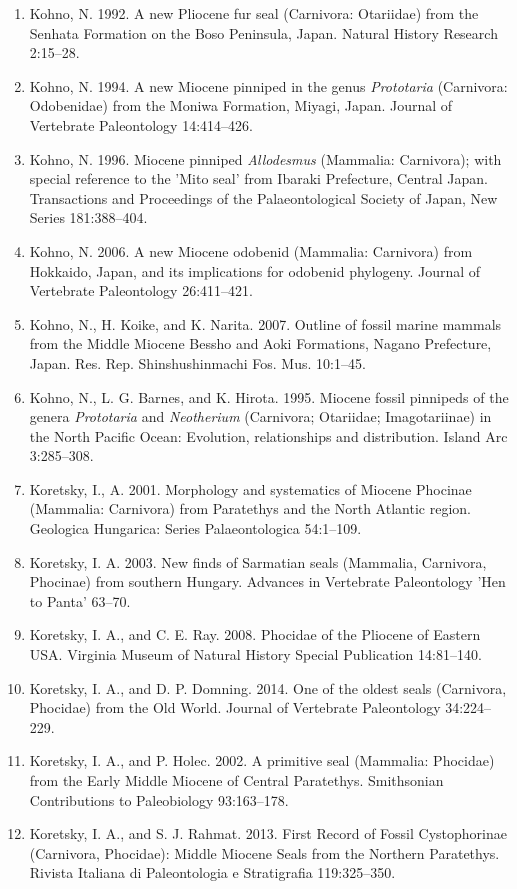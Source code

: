 \documentclass[a4paper, 12pt]{article}
\begin{document}
\begin{enumerate}
\item Kohno, N. 1992. A new Pliocene fur seal (Carnivora: Otariidae) from the Senhata Formation on the Boso Peninsula, Japan. Natural History Research 2:15–28.
\item Kohno, N. 1994. A new Miocene pinniped in the genus \textit{Prototaria} (Carnivora: Odobenidae) from the Moniwa Formation, Miyagi, Japan. Journal of Vertebrate Paleontology 14:414–426.
\item Kohno, N. 1996. Miocene pinniped \textit{Allodesmus} (Mammalia: Carnivora); with special reference to the 'Mito seal' from Ibaraki Prefecture, Central Japan. Transactions and Proceedings of the Palaeontological Society of Japan, New Series 181:388–404.
\item Kohno, N. 2006. A new Miocene odobenid (Mammalia: Carnivora) from Hokkaido, Japan, and its implications for odobenid phylogeny. Journal of Vertebrate Paleontology 26:411–421.
\item Kohno, N., H. Koike, and K. Narita. 2007. Outline of fossil marine mammals from the Middle Miocene Bessho and Aoki Formations, Nagano Prefecture, Japan. Res. Rep. Shinshushinmachi Fos. Mus. 10:1–45.
\item Kohno, N., L. G. Barnes, and K. Hirota. 1995. Miocene fossil pinnipeds of the genera \textit{Prototaria} and \textit{Neotherium} (Carnivora; Otariidae; Imagotariinae) in the North Pacific Ocean: Evolution, relationships and distribution. Island Arc 3:285–308.
\item Koretsky, I., A. 2001. Morphology and systematics of Miocene Phocinae (Mammalia: Carnivora) from Paratethys and the North Atlantic region. Geologica Hungarica: Series Palaeontologica 54:1–109.
\item Koretsky, I. A. 2003. New finds of Sarmatian seals (Mammalia, Carnivora, Phocinae) from southern Hungary. Advances in Vertebrate Paleontology 'Hen to Panta' 63–70.
\item Koretsky, I. A., and C. E. Ray. 2008. Phocidae of the Pliocene of Eastern USA. Virginia Museum of Natural History Special Publication 14:81–140.
\item Koretsky, I. A., and D. P. Domning. 2014. One of the oldest seals (Carnivora, Phocidae) from the Old World. Journal of Vertebrate Paleontology 34:224–229.
\item Koretsky, I. A., and P. Holec. 2002. A primitive seal (Mammalia: Phocidae) from the Early Middle Miocene of Central Paratethys. Smithsonian Contributions to Paleobiology 93:163–178.
\item Koretsky, I. A., and S. J. Rahmat. 2013. First Record of Fossil Cystophorinae (Carnivora, Phocidae): Middle Miocene Seals from the Northern Paratethys. Rivista Italiana di Paleontologia e Stratigrafia 119:325–350.

\end{enumerate}
\end{document}
